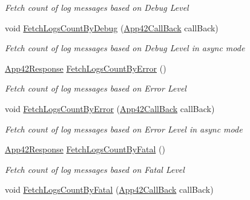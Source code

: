 \begin{DoxyCompactItemize}
\begin{DoxyCompactList}\small\item\em Fetch count of log messages based on Debug Level \end{DoxyCompactList}\item 
void \hyperlink{classcom_1_1shephertz_1_1app42_1_1paas_1_1sdk_1_1csharp_1_1log_1_1_log_service_a6e608c004ec58e8fdec900e5c16fcc45}{Fetch\+Logs\+Count\+By\+Debug} (\hyperlink{interfacecom_1_1shephertz_1_1app42_1_1paas_1_1sdk_1_1csharp_1_1_app42_call_back}{App42\+Call\+Back} call\+Back)
\begin{DoxyCompactList}\small\item\em Fetch count of log messages based on Debug Level in async mode \end{DoxyCompactList}\item 
\hyperlink{classcom_1_1shephertz_1_1app42_1_1paas_1_1sdk_1_1csharp_1_1_app42_response}{App42\+Response} \hyperlink{classcom_1_1shephertz_1_1app42_1_1paas_1_1sdk_1_1csharp_1_1log_1_1_log_service_ad897f4b763566b432fb15058d5fe6cb5}{Fetch\+Logs\+Count\+By\+Error} ()
\begin{DoxyCompactList}\small\item\em Fetch count of log messages based on Error Level \end{DoxyCompactList}\item 
void \hyperlink{classcom_1_1shephertz_1_1app42_1_1paas_1_1sdk_1_1csharp_1_1log_1_1_log_service_a02fd3c16175c3971d80d47612c09bb17}{Fetch\+Logs\+Count\+By\+Error} (\hyperlink{interfacecom_1_1shephertz_1_1app42_1_1paas_1_1sdk_1_1csharp_1_1_app42_call_back}{App42\+Call\+Back} call\+Back)
\begin{DoxyCompactList}\small\item\em Fetch count of log messages based on Error Level in async mode \end{DoxyCompactList}\item 
\hyperlink{classcom_1_1shephertz_1_1app42_1_1paas_1_1sdk_1_1csharp_1_1_app42_response}{App42\+Response} \hyperlink{classcom_1_1shephertz_1_1app42_1_1paas_1_1sdk_1_1csharp_1_1log_1_1_log_service_a4d1863226a1c0ef97d02e479ea61de18}{Fetch\+Logs\+Count\+By\+Fatal} ()
\begin{DoxyCompactList}\small\item\em Fetch count of log messages based on Fatal Level \end{DoxyCompactList}\item 
void \hyperlink{classcom_1_1shephertz_1_1app42_1_1paas_1_1sdk_1_1csharp_1_1log_1_1_log_service_a02cb88ef3e80164c99fcd6aea827791d}{Fetch\+Logs\+Count\+By\+Fatal} (\hyperlink{interfacecom_1_1shephertz_1_1app42_1_1paas_1_1sdk_1_1csharp_1_1_app42_call_back}{App42\+Call\+Back} call\+Back)

\end{DoxyCompactItemize}
